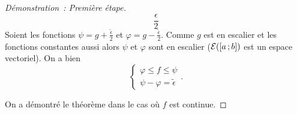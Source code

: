 \begin{proof}[Démonstration~: Première étape]
\begin{equation}
    \frac{\epsilon}{2}
  \end{equation}
  Soient les fonctions \(\psi=g + \frac{\tilde{\epsilon}}{2}\) et \(\varphi=g - 
  \frac{\tilde{\epsilon}}{2}\). Comme \(g\) est en escalier et les fonctions 
  constantes aussi alors \(\psi\) et \(\varphi\) sont en escalier 
  (\(\mathcal{E}(\left[ a \, ;  b \right])\) est un espace vectoriel). On a bien
  \begin{equation}
    \begin{cases}
      \varphi \leqslant f \leqslant \psi \\
      \psi-\varphi=\tilde{\epsilon}
    \end{cases}.
  \end{equation}

  On a démontré le théorème dans le cas où \(f\) est continue.
\end{proof}
